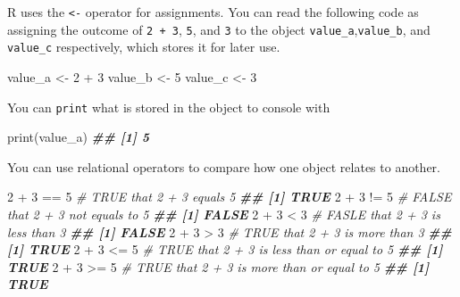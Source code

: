 \documentclass[
]{book}
\newenvironment{Shaded}{\begin{snugshade}}{\end{snugshade}}
\newcommand{\CommentTok}[1]{\textcolor[rgb]{0.56,0.35,0.01}{\textit{#1}}}
\newcommand{\DecValTok}[1]{\textcolor[rgb]{0.00,0.00,0.81}{#1}}
\newcommand{\DocumentationTok}[1]{\textcolor[rgb]{0.56,0.35,0.01}{\textbf{\textit{#1}}}}
\newcommand{\FunctionTok}[1]{\textcolor[rgb]{0.00,0.00,0.00}{#1}}
\newcommand{\NormalTok}[1]{#1}
\newcommand{\OtherTok}[1]{\textcolor[rgb]{0.56,0.35,0.01}{#1}}
\newcommand{\SpecialCharTok}[1]{\textcolor[rgb]{0.00,0.00,0.00}{#1}}
\begin{document}
R uses the \texttt{\textless{}-} operator for assignments. You can read the following code as assigning the outcome of \texttt{2\ +\ 3}, \texttt{5}, and \texttt{3} to the object \texttt{value\_a},\texttt{value\_b}, and \texttt{value\_c} respectively, which stores it for later use.

\begin{Shaded}
\begin{Highlighting}[]
\NormalTok{value\_a }\OtherTok{\textless{}{-}} \DecValTok{2} \SpecialCharTok{+} \DecValTok{3}
\NormalTok{value\_b }\OtherTok{\textless{}{-}} \DecValTok{5}
\NormalTok{value\_c }\OtherTok{\textless{}{-}} \DecValTok{3}
\end{Highlighting}
\end{Shaded}

You can \texttt{print} what is stored in the object to console with

\begin{Shaded}
\begin{Highlighting}[]
\FunctionTok{print}\NormalTok{(value\_a)}
\DocumentationTok{\#\# [1] 5}
\end{Highlighting}
\end{Shaded}

You can use relational operators to compare how one object relates to another.

\begin{Shaded}
\begin{Highlighting}[]
\DecValTok{2} \SpecialCharTok{+} \DecValTok{3} \SpecialCharTok{==} \DecValTok{5} \CommentTok{\# TRUE that 2 + 3 equals 5}
\DocumentationTok{\#\# [1] TRUE}
\DecValTok{2} \SpecialCharTok{+} \DecValTok{3} \SpecialCharTok{!=} \DecValTok{5} \CommentTok{\# FALSE that 2 + 3 not equals to 5}
\DocumentationTok{\#\# [1] FALSE}
\DecValTok{2} \SpecialCharTok{+} \DecValTok{3} \SpecialCharTok{\textless{}} \DecValTok{3} \CommentTok{\# FASLE that 2 + 3 is less than 3}
\DocumentationTok{\#\# [1] FALSE}
\DecValTok{2} \SpecialCharTok{+} \DecValTok{3} \SpecialCharTok{\textgreater{}} \DecValTok{3} \CommentTok{\# TRUE that 2 + 3 is more than 3}
\DocumentationTok{\#\# [1] TRUE}
\DecValTok{2} \SpecialCharTok{+} \DecValTok{3} \SpecialCharTok{\textless{}=} \DecValTok{5} \CommentTok{\# TRUE that 2 + 3 is less than or equal to 5}
\DocumentationTok{\#\# [1] TRUE}
\DecValTok{2} \SpecialCharTok{+} \DecValTok{3} \SpecialCharTok{\textgreater{}=} \DecValTok{5} \CommentTok{\# TRUE that 2 + 3 is more than or equal to 5}
\DocumentationTok{\#\# [1] TRUE}
\end{Highlighting}
\end{Shaded}
\end{document}
